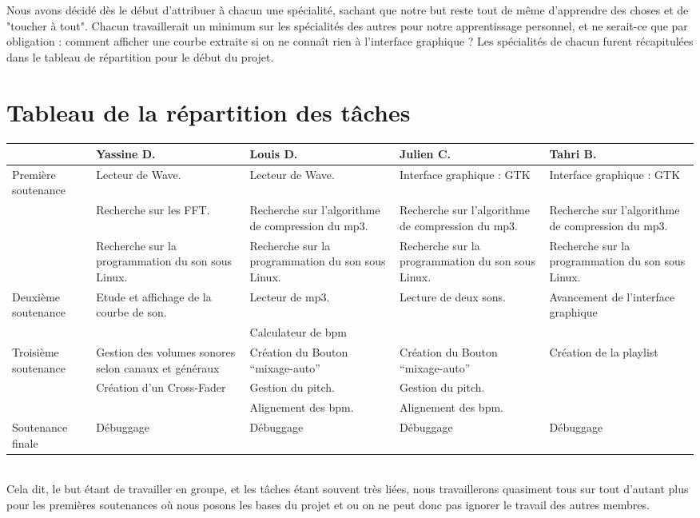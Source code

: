 \documentclass[12pt]{report}
\begin{document}
Nous avons décidé dès le début d'attribuer à chacun une
spécialité, sachant que notre but reste tout de même d'apprendre
des choses et de "toucher à tout". Chacun travaillerait un minimum
sur les spécialités des autres pour notre apprentissage personnel,
et ne serait-ce que par obligation : comment afficher une courbe
extraite si on ne connaît rien à l'interface graphique ?
Les spécialités de chacun furent récapitulées dans le tableau de répartition pour le début du projet.\\
    \section{Tableau de la répartition des tâches}
    \begin{center}
    \begin{tabular}{|p{2 cm}||p{2.5cm}|p{2.5cm}|p{2.5cm}|p{2.5cm}|}
\hline
 & Yassine D. & Louis D. & Julien C. & Tahri B.
\\
\hline \hline Première soutenance
 & Lecteur de Wave.
 & Lecteur de Wave.
 & Interface graphique : GTK
 & Interface graphique : GTK
\\
 & Recherche sur les FFT.
 & Recherche sur l'algorithme de compression du mp3.
 & Recherche sur l'algorithme de compression du mp3.
 & Recherche sur l'algorithme de compression du mp3.
\\
 & Recherche sur la programmation du son sous Linux.
 & Recherche sur la programmation du son sous Linux.
 & Recherche sur la programmation du son sous Linux.
 & Recherche sur la programmation du son sous Linux.
\\
\hline Deuxième soutenance
 & Etude et affichage de la courbe de son.
 & Lecteur de mp3.
 & Lecture de deux sons.
 & Avancement de l'interface graphique
\\
 &
 & Calculateur de bpm
 &
 &
\\
\hline Troisième soutenance
 & Gestion des volumes sonores selon canaux et généraux
 & Création du Bouton ``mixage-auto''
 & Création du Bouton ``mixage-auto''
 & Création de la playlist
\\
 & Création d'un Cross-Fader
 & Gestion du pitch.
 & Gestion du pitch.
 &
\\
 &
 & Alignement des bpm.
 & Alignement des bpm.
 &
\\
\hline Soutenance finale
 & Débuggage
 & Débuggage
 & Débuggage
 & Débuggage
\\
\hline
\end{tabular}
    \end{center}
    \\
Cela dit, le but étant de travailler en groupe, et les tâches
étant souvent très liées, nous travaillerons quasiment tous sur
tout d'autant plus pour les premières soutenances où nous posons
les bases du projet et ou on ne peut donc pas ignorer le travail
des autres membres.
\end{document}
